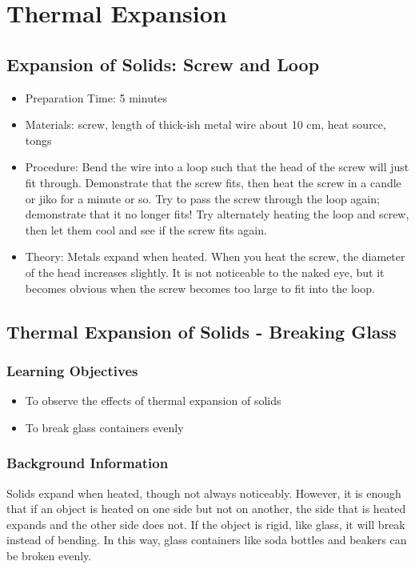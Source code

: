 \section{Thermal Expansion}



\subsection{Expansion of Solids: Screw and Loop}
\begin{itemize}
\item{Preparation Time: 5 minutes}
\item{Materials: screw, length of thick-ish metal wire about 10 cm, heat source, tongs}
\item{Procedure: Bend the wire into a loop such that the head of the screw will just fit through. Demonstrate that the screw fits, then heat the screw in a candle or jiko for a minute or so. Try to pass the screw through the loop again; demonstrate that it no longer fits! Try alternately heating the loop and screw, then let them cool and see if the screw fits again.}
\item{Theory: Metals expand when heated. When you heat the screw, the diameter of the head increases slightly. It is not noticeable to the naked eye, but it becomes obvious when the screw becomes too large to fit into the loop.}
\end{itemize}


\subsection{Thermal Expansion of Solids - Breaking Glass}

\subsubsection*{Learning Objectives}
\begin{itemize}
\item{To observe the effects of thermal expansion of solids}
\item{To break glass containers evenly}
\end{itemize}

\subsubsection*{Background Information}
Solids expand when heated, though not always noticeably.  However, it is enough that if an object is heated on one side but not on another, the side that is heated expands and the other side does not.  If the object is rigid, like glass, it will break instead of bending.  In this way, glass containers like soda bottles and beakers can be broken evenly.

